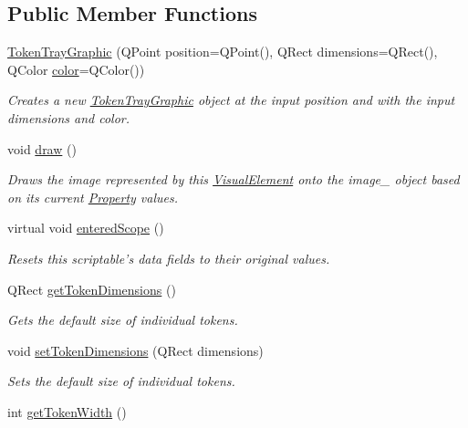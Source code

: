 \subsection*{Public Member Functions}
\begin{DoxyCompactItemize}
\item 
\hyperlink{class_picto_1_1_token_tray_graphic_a5b4711d555a04212a785320f254075fb}{Token\-Tray\-Graphic} (Q\-Point position=Q\-Point(), Q\-Rect dimensions=Q\-Rect(), Q\-Color \hyperlink{struct_picto_1_1_visual_element_a45c3042c969717eb2ab60373369c7de7}{color}=Q\-Color())
\begin{DoxyCompactList}\small\item\em Creates a new \hyperlink{class_picto_1_1_token_tray_graphic}{Token\-Tray\-Graphic} object at the input position and with the input dimensions and color. \end{DoxyCompactList}\item 
\hypertarget{class_picto_1_1_token_tray_graphic_a15979af641e4ce8076fbda9f7589a21d}{void \hyperlink{class_picto_1_1_token_tray_graphic_a15979af641e4ce8076fbda9f7589a21d}{draw} ()}\label{class_picto_1_1_token_tray_graphic_a15979af641e4ce8076fbda9f7589a21d}

\begin{DoxyCompactList}\small\item\em Draws the image represented by this \hyperlink{struct_picto_1_1_visual_element}{Visual\-Element} onto the image\-\_\- object based on its current \hyperlink{class_picto_1_1_property}{Property} values. \end{DoxyCompactList}\item 
virtual void \hyperlink{class_picto_1_1_token_tray_graphic_a3f52cce28e27dc2bdba49d7fa3b796e8}{entered\-Scope} ()
\begin{DoxyCompactList}\small\item\em Resets this scriptable's data fields to their original values. \end{DoxyCompactList}\item 
Q\-Rect \hyperlink{class_picto_1_1_token_tray_graphic_acd40c1bdeadf412a8e3bce48a6178647}{get\-Token\-Dimensions} ()
\begin{DoxyCompactList}\small\item\em Gets the default size of individual tokens. \end{DoxyCompactList}\item 
void \hyperlink{class_picto_1_1_token_tray_graphic_a29294f85131e1375bbf8518cbae60da1}{set\-Token\-Dimensions} (Q\-Rect dimensions)
\begin{DoxyCompactList}\small\item\em Sets the default size of individual tokens. \end{DoxyCompactList}\item 
\hypertarget{class_picto_1_1_token_tray_graphic_a6fbcff6b89b2020e26c50de123a2198f}{int \hyperlink{class_picto_1_1_token_tray_graphic_a6fbcff6b89b2020e26c50de123a2198f}{get\-Token\-Width} ()}\label{class_picto_1_1_token_tray_graphic_a6fbcff6b89b2020e26c50de123a2198f}


\end{DoxyCompactItemize}
